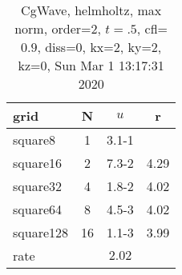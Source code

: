\begin{table}[H]\tableFont %
\begin{center}
\begin{tabular}{|l|c|c|c|} \hline 
grid  & N &  $ u $ & r \\ \hline 
   square8 &     1 & \num{3.1}{-1} &       \\ \hline
  square16 &     2 & \num{7.3}{-2} &  4.29  \\ \hline
  square32 &     4 & \num{1.8}{-2} &  4.02  \\ \hline
  square64 &     8 & \num{4.5}{-3} &  4.02  \\ \hline
 square128 &    16 & \num{1.1}{-3} &  3.99  \\ \hline
    rate             &       &  $2.02$       &       \\ \hline
\end{tabular}
\caption{CgWave, helmholtz, max norm, order=$2$, $t=.5$, cfl=$0.9$, diss=$0$, kx=2, ky=2, kz=0, Sun Mar  1 13:17:31 2020}\label{table:helmholtzOrder2max}
\end{center}
\end{table}

